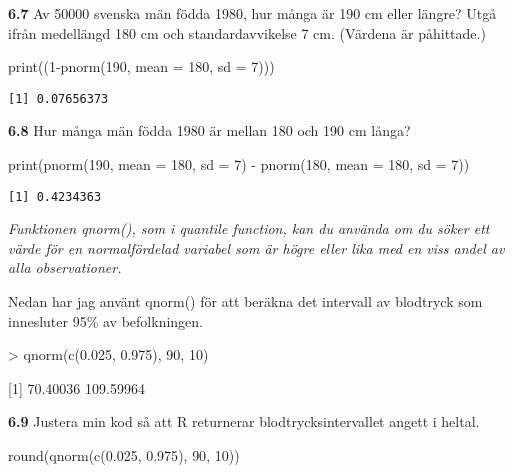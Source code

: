 \documentclass[
  letterpaper,
  DIV=11,
  numbers=noendperiod]{scrartcl}
\newenvironment{Shaded}{\begin{snugshade}}{\end{snugshade}}
\newcommand{\AttributeTok}[1]{\textcolor[rgb]{0.40,0.45,0.13}{#1}}
\newcommand{\DecValTok}[1]{\textcolor[rgb]{0.68,0.00,0.00}{#1}}
\newcommand{\FloatTok}[1]{\textcolor[rgb]{0.68,0.00,0.00}{#1}}
\newcommand{\FunctionTok}[1]{\textcolor[rgb]{0.28,0.35,0.67}{#1}}
\newcommand{\NormalTok}[1]{\textcolor[rgb]{0.00,0.23,0.31}{#1}}
\newcommand{\SpecialCharTok}[1]{\textcolor[rgb]{0.37,0.37,0.37}{#1}}
\begin{document}
\textbf{6.7} Av 50000 svenska män födda 1980, hur många är 190 cm eller
längre? Utgå ifrån medellängd 180 cm och standardavvikelse 7 cm.
(Värdena är påhittade.)

\begin{Shaded}
\begin{Highlighting}[]
\FunctionTok{print}\NormalTok{((}\DecValTok{1}\SpecialCharTok{{-}}\FunctionTok{pnorm}\NormalTok{(}\DecValTok{190}\NormalTok{, }\AttributeTok{mean =} \DecValTok{180}\NormalTok{, }\AttributeTok{sd =} \DecValTok{7}\NormalTok{)))}
\end{Highlighting}
\end{Shaded}

\begin{verbatim}
[1] 0.07656373
\end{verbatim}

\textbf{6.8} Hur många män födda 1980 är mellan 180 och 190 cm långa?

\begin{Shaded}
\begin{Highlighting}[]
\FunctionTok{print}\NormalTok{(}\FunctionTok{pnorm}\NormalTok{(}\DecValTok{190}\NormalTok{, }\AttributeTok{mean =} \DecValTok{180}\NormalTok{, }\AttributeTok{sd =} \DecValTok{7}\NormalTok{) }\SpecialCharTok{{-}} \FunctionTok{pnorm}\NormalTok{(}\DecValTok{180}\NormalTok{, }\AttributeTok{mean =} \DecValTok{180}\NormalTok{, }\AttributeTok{sd =} \DecValTok{7}\NormalTok{))}
\end{Highlighting}
\end{Shaded}

\begin{verbatim}
[1] 0.4234363
\end{verbatim}

\emph{Funktionen qnorm(), som i quantile function, kan du använda om du
söker ett värde för en normalfördelad variabel som är högre eller lika
med en viss andel av alla observationer.}

Nedan har jag använt qnorm() för att beräkna det intervall av blodtryck
som innesluter 95\% av befolkningen.

\textgreater{} qnorm(c(0.025, 0.975), 90, 10)

{[}1{]} 70.40036 109.59964

\textbf{6.9} Justera min kod så att R returnerar blodtrycksintervallet
angett i heltal.

\begin{Shaded}
\begin{Highlighting}[]
\FunctionTok{round}\NormalTok{(}\FunctionTok{qnorm}\NormalTok{(}\FunctionTok{c}\NormalTok{(}\FloatTok{0.025}\NormalTok{, }\FloatTok{0.975}\NormalTok{), }\DecValTok{90}\NormalTok{, }\DecValTok{10}\NormalTok{))}
\end{Highlighting}
\end{Shaded}
\end{document}

